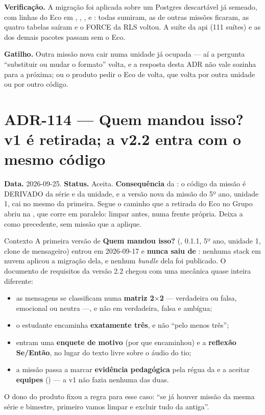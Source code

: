 \textbf{Verificação.} A migração foi aplicada sobre um Postgres descartável já
semeado, com linhas do Eco em , ,
,  e : todas
sumiram, as de outras missões ficaram, as quatro tabelas saíram e o FORCE da RLS
voltou. A suíte da api (111 suítes) e as dos demais pacotes passam sem o Eco.

\textbf{Gatilho.} Outra missão nova cair numa unidade já ocupada --- aí a
pergunta \enquote{substituir ou mudar o formato} volta, e a resposta desta ADR
não vale sozinha para a próxima; ou o produto pedir o Eco de volta, que volta
por outra unidade ou por outro código.

\section{ADR-114 --- Quem mandou isso? v1 é retirada; a v2.2 entra com o mesmo código}
\label{adr:v1-do-5-ano-retirada}

\textbf{Data.} 2026-09-25. \textbf{Status.} Aceita.
\textbf{Consequência} da : o código da missão é DERIVADO da série e
da unidade, e a versão nova da missão do 5º ano, unidade 1, cai no mesmo
 da primeira. Segue o caminho que a retirada do Eco no Grupo
abriu na , que corre em paralelo: limpar antes, numa frente
própria. Deixa a  como precedente, sem missão que a aplique.

\begin{especificacao}{Contexto}
A primeira versão de \textbf{Quem mandou isso?} (, 0.1.1, 5º ano,
unidade 1, clone de mensageiro) entrou em 2026-09-17 e \textbf{nunca saiu de
}: nenhuma stack em nuvem aplicou a migração dela, e nenhum
\emph{bundle} dela foi publicado. O documento de requisitos da versão 2.2
chegou com uma mecânica quase inteira diferente:

\begin{itemize}
  \item as mensagens se classificam numa \textbf{matriz 2$\times$2} ---
    verdadeira ou falsa, emocional ou neutra ---, e não em verdadeira, falsa e
    ambígua;
  \item o estudante encaminha \textbf{exatamente três}, e não \enquote{pelo
    menos três};
  \item entram uma \textbf{enquete de motivo} (por que encaminhou) e a
    \textbf{reflexão Se/Então}, no lugar do texto livre sobre o áudio do tio;
  \item a missão passa a marcar \textbf{evidência pedagógica} pela régua da
     e a aceitar \textbf{equipes} () --- a v1 não
    fazia nenhuma das duas.
\end{itemize}

O dono do produto fixou a regra para esse caso: \enquote{se já houver missão da
mesma série e bimestre, primeiro vamos limpar e excluir tudo da antiga}.
\end{especificacao}

